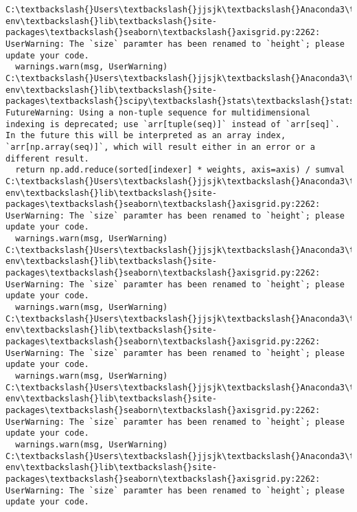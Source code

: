 \documentclass[11pt]{article}
\begin{document}
    \begin{Verbatim}[commandchars=\\\{\}]
C:\textbackslash{}Users\textbackslash{}jjsjk\textbackslash{}Anaconda3\textbackslash{}envs\textbackslash{}learn-env\textbackslash{}lib\textbackslash{}site-packages\textbackslash{}seaborn\textbackslash{}axisgrid.py:2262: UserWarning: The `size` paramter has been renamed to `height`; please update your code.
  warnings.warn(msg, UserWarning)
C:\textbackslash{}Users\textbackslash{}jjsjk\textbackslash{}Anaconda3\textbackslash{}envs\textbackslash{}learn-env\textbackslash{}lib\textbackslash{}site-packages\textbackslash{}scipy\textbackslash{}stats\textbackslash{}stats.py:1713: FutureWarning: Using a non-tuple sequence for multidimensional indexing is deprecated; use `arr[tuple(seq)]` instead of `arr[seq]`. In the future this will be interpreted as an array index, `arr[np.array(seq)]`, which will result either in an error or a different result.
  return np.add.reduce(sorted[indexer] * weights, axis=axis) / sumval
C:\textbackslash{}Users\textbackslash{}jjsjk\textbackslash{}Anaconda3\textbackslash{}envs\textbackslash{}learn-env\textbackslash{}lib\textbackslash{}site-packages\textbackslash{}seaborn\textbackslash{}axisgrid.py:2262: UserWarning: The `size` paramter has been renamed to `height`; please update your code.
  warnings.warn(msg, UserWarning)
C:\textbackslash{}Users\textbackslash{}jjsjk\textbackslash{}Anaconda3\textbackslash{}envs\textbackslash{}learn-env\textbackslash{}lib\textbackslash{}site-packages\textbackslash{}seaborn\textbackslash{}axisgrid.py:2262: UserWarning: The `size` paramter has been renamed to `height`; please update your code.
  warnings.warn(msg, UserWarning)
C:\textbackslash{}Users\textbackslash{}jjsjk\textbackslash{}Anaconda3\textbackslash{}envs\textbackslash{}learn-env\textbackslash{}lib\textbackslash{}site-packages\textbackslash{}seaborn\textbackslash{}axisgrid.py:2262: UserWarning: The `size` paramter has been renamed to `height`; please update your code.
  warnings.warn(msg, UserWarning)
C:\textbackslash{}Users\textbackslash{}jjsjk\textbackslash{}Anaconda3\textbackslash{}envs\textbackslash{}learn-env\textbackslash{}lib\textbackslash{}site-packages\textbackslash{}seaborn\textbackslash{}axisgrid.py:2262: UserWarning: The `size` paramter has been renamed to `height`; please update your code.
  warnings.warn(msg, UserWarning)
C:\textbackslash{}Users\textbackslash{}jjsjk\textbackslash{}Anaconda3\textbackslash{}envs\textbackslash{}learn-env\textbackslash{}lib\textbackslash{}site-packages\textbackslash{}seaborn\textbackslash{}axisgrid.py:2262: UserWarning: The `size` paramter has been renamed to `height`; please update your code.

\end{Verbatim}
\end{document}
